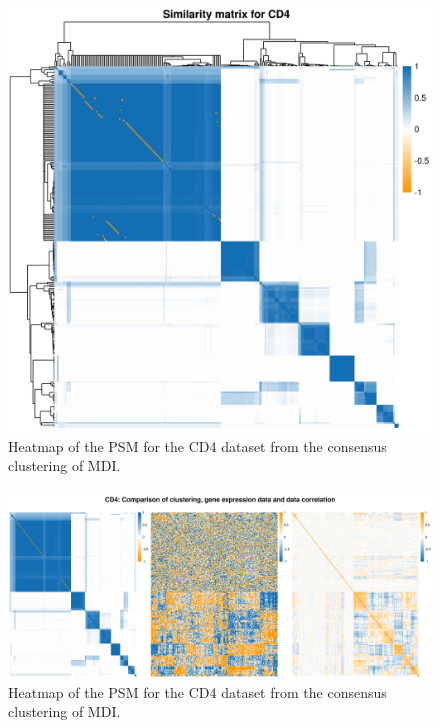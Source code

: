 \documentclass[12pt]{article} %
\begin{document}
	
	\begin{figure}[h]
		\centering
		\includegraphics[scale=0.75]{Images/Biology_data/Set_250/All_datasets/Similarity_matrices/similarity_matrix_CD4.png}
		\caption{Heatmap of the PSM for the CD4 dataset from the consensus clustering of MDI.}
		\label{fig:results:cedar_1:mdi_cd4_psm}
	\end{figure}
	
	\newpage
	
	\begin{figure}
		\centering
		\includegraphics[scale=0.5]{Images/Biology_data/Set_250/All_datasets/Comparison_expression_clustering_correlation/CD4.png}
		\caption{Heatmap of the PSM for the CD4 dataset from the consensus clustering of MDI.}
		\label{fig:results:cedar_1:mdi_cd4_psm_expr_cor}
	\end{figure}
\end{document}
